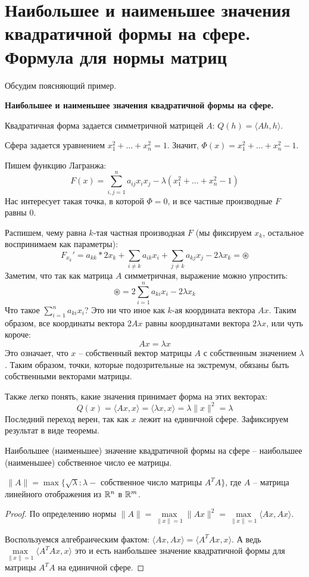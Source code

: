 \section{Наибольшее и наименьшее значения квадратичной формы на сфере. Формула для нормы матриц}
Обсудим поясняющий пример.

\textbf{Наибольшее и наименьшее значения квадратичной формы на сфере.}

    Квадратичная форма задается симметричной матрицей $A$: $Q(h) = \langle Ah, h \rangle$.

    Сфера задается уравнением $x_1^2 + \dots + x_n^2 = 1$.
    Значит, $\Phi(x) = x_1^2 + \dots + x_n^2 - 1$.

    Пишем функцию Лагранжа: \[ F(x) = \sum_{i, j = 1}^n a_{ij}x_ix_j - \lambda(x_1^2 + \dots + x_n^2 - 1) \]
    Нас интересует такая точка, в которой $\Phi = 0$, и все частные производные $F$ равны 0.

    Распишем, чему равна $k$-тая частная производная $F$ (мы фиксируем $x_k$, остальное воспринимаем как параметры): \[ F_{x_k}' = a_{kk}*2x_k + \sum_{i\neq k} a_{ik}x_i + \sum_{j \neq k} a_{kj}x_j -2\lambda x_k = \circledast \]
    Заметим, что так как матрица $A$ симметричная, выражение можно упростить: \[ \circledast = 2\sum_{i = 1}^n a_{ki}x_i - 2\lambda x_k \]
    Что такое $\sum\limits_{i = 1}^n a_{ki}x_i$? 
    Это ни что иное как $k$-ая координата вектора $Ax$. 
    Таким образом, все координаты вектора $2Ax$ равны координатами вектора $2\lambda x$, или чуть короче: \[ Ax = \lambda x \]
    Это означает, что $x$ -- собственный вектор матрицы $A$ с собственным значением $\lambda$.
    Таким образом, точки, которые подозрительные на экстремум, обязаны быть собственными векторами матрицы.
    
    Также легко понять, какие значения принимает форма на этих векторах: \[ Q(x) = \langle Ax, x \rangle = \langle \lambda x, x \rangle = \lambda \| x \|^2 = \lambda  \]
    Последний переход верен, так как $x$ лежит на единичной сфере.
    Зафиксируем результат в виде теоремы.

\begin{theorem}
    Наибольшее (наименьшее) значение квадратичной формы на сфере -- наибольшее (наименьшее) собственное число ее матрицы.
\end{theorem}

\vspace*{6mm}

\follow $\, \| A \| = \max \{ \sqrt{\lambda} : \lambda - \text{ собственное число матрицы } A^TA \}$, где $A$ -- матрица линейного отображения из $\mathbb{R}^n$ в $\mathbb{R}^m$.
\begin{proof}
    По определению нормы $\|A\| = \max\limits_{\|x\| = 1} \|Ax\|^2 = \max\limits_{\|x\| = 1} \langle Ax, Ax \rangle$.
    
    Воспользуемся алгебраическим фактом: $\langle Ax, Ax \rangle = \langle A^TAx, x \rangle$.
    А ведь $\max\limits_{\|x\| = 1} \langle A^TAx, x \rangle$ это и есть наибольшее значение квадратичной формы для матрицы $A^TA$ на единичной сфере.
\end{proof}
